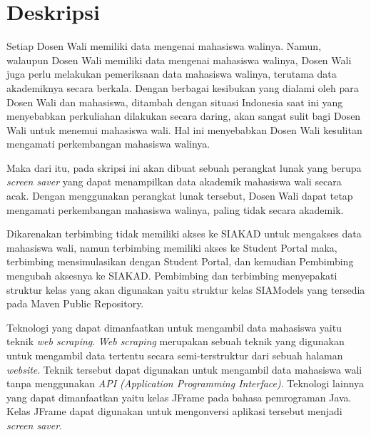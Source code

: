 \documentclass[a4paper,twoside]{article}
\begin{document}
\title{\@judultopik}
\author{\nama \textendash \@npm} 

\newcommand{\nama}{Harry Senjaya Darmawan}
\newcommand{\@npm}{2017730067}
\newcommand{\@judultopik}{Mahasiswa Wali Screen Saver} %
\newcommand{\jumpemb}{1} %
\newcommand{\tanggal}{08/10/2020}


\maketitle


\section{Deskripsi}
Setiap Dosen Wali memiliki data mengenai mahasiswa walinya. Namun, walaupun Dosen Wali memiliki data mengenai mahasiswa walinya, Dosen Wali juga perlu melakukan pemeriksaan data mahasiswa walinya, terutama data akademiknya secara berkala. Dengan berbagai kesibukan yang dialami oleh para Dosen Wali dan mahasiswa, ditambah dengan situasi Indonesia saat ini yang menyebabkan perkuliahan dilakukan secara daring, akan sangat sulit bagi Dosen Wali untuk menemui mahasiswa wali. Hal ini menyebabkan Dosen Wali kesulitan mengamati perkembangan mahasiswa walinya. 

Maka dari itu, pada skripsi ini akan dibuat sebuah perangkat lunak yang berupa \textit{screen saver} yang dapat menampilkan data akademik mahasiswa wali secara acak. Dengan menggunakan perangkat lunak tersebut, Dosen Wali dapat tetap mengamati perkembangan mahasiswa walinya, paling tidak secara akademik.

Dikarenakan terbimbing tidak memiliki akses ke SIAKAD untuk mengakses data mahasiswa wali, namun terbimbing memiliki akses ke Student Portal maka, terbimbing mensimulasikan dengan Student Portal, dan kemudian Pembimbing mengubah aksesnya ke SIAKAD. Pembimbing dan terbimbing menyepakati struktur kelas yang akan digunakan yaitu struktur kelas SIAModels yang tersedia pada Maven Public Repository.

Teknologi yang dapat dimanfaatkan untuk mengambil data mahasiswa yaitu teknik \textit{web scraping}. \textit{Web scraping} merupakan sebuah teknik yang digunakan untuk mengambil data tertentu secara semi-terstruktur dari sebuah halaman \textit{website}. Teknik tersebut dapat digunakan untuk mengambil data mahasiswa wali tanpa menggunakan \textit{API (Application Programming Interface)}. Teknologi lainnya yang dapat dimanfaatkan yaitu kelas JFrame pada bahasa pemrograman Java. Kelas JFrame dapat digunakan untuk mengonversi aplikasi tersebut menjadi \textit{screen saver}.
\end{document}
